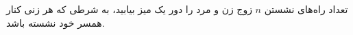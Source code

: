 \p
تعداد راه‌های نشستن $n$ 
زوج زن و مرد را دور یک میز بیابید، به شرطی که 
هر زنی کنار همسر خود نشسته باشد.
